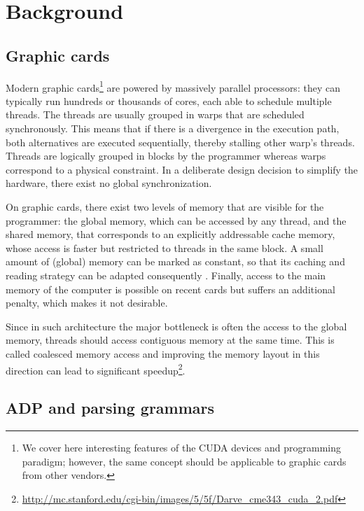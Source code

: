 
\section{Background} \label{background}
\subsection{Graphic cards}
Modern graphic cards\footnote{We cover here interesting features of the CUDA devices and programming paradigm; however, the same concept should be applicable to graphic cards from other vendors.} are powered by massively parallel processors: they can typically run hundreds or thousands of cores, each able to schedule multiple threads. The threads are usually grouped in warps that are scheduled synchronously. This means that if there is a divergence in the execution path, both alternatives are executed sequentially, thereby stalling other warp's threads. Threads are logically grouped in blocks by the programmer whereas warps correspond to a physical constraint. In a deliberate design decision to simplify the hardware, there exist no global synchronization.

On graphic cards, there exist two levels of memory that are visible for the programmer: the global memory, which can be accessed by any thread, and the shared memory, that corresponds to an explicitly addressable cache memory, whose access is faster but restricted to threads in the same block. A small amount of (global) memory can be marked as constant, so that its caching and reading strategy can be adapted consequently \cite{cuda_constant}. Finally, access to the main memory of the computer is possible on recent cards but suffers an additional penalty, which makes it not desirable.

Since in such architecture the major bottleneck is often the access to the global memory, threads should access contiguous memory at the same time. This is called coalesced memory access and improving the memory layout in this direction can lead to significant speedup\footnote{\url{http://mc.stanford.edu/cgi-bin/images/5/5f/Darve_cme343_cuda_2.pdf}}.

\newpage
\subsection{ADP and parsing grammars} \label{adp_grammar}
